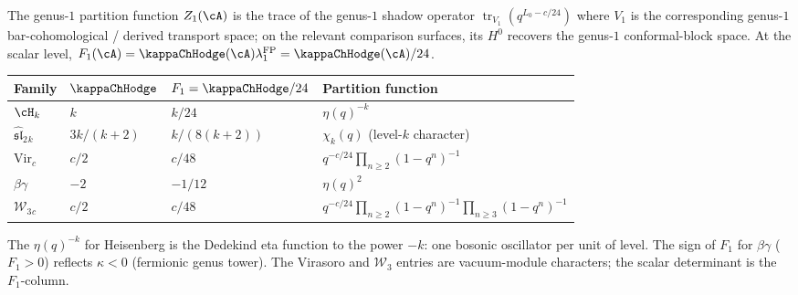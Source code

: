 \begin{computation}
\label{comp:genus1-partition-functions}
The genus-$1$ partition function $Z_1(\cA)$
is the trace of the genus-$1$ shadow operator
$\operatorname{tr}_{V_1}(q^{L_0-c/24})$ where
$V_1$ is the corresponding genus-$1$ bar-cohomological /
derived transport space; on the relevant comparison surfaces,
its $H^0$ recovers the genus-$1$ conformal-block space.
At the scalar level,
$F_1(\cA)=\kappaChHodge(\cA)\lambda_1^{\mathrm{FP}}
=\kappaChHodge(\cA)/24$.
\begin{center}
\renewcommand{\arraystretch}{1.2}
\begin{tabular}{llll}
\textbf{Family} & $\kappaChHodge$ & $F_1=\kappaChHodge/24$
 & \textbf{Partition function} \\
\hline
$\cH_k$ & $k$ & $k/24$
 & $\eta(q)^{-k}$ \\
$\widehat{\mathfrak{sl}}_2{}_k$
 & $3k/(k{+}2)$ & $k/(8(k{+}2))$
 & $\chi_k(q)$ (level-$k$ character) \\
$\mathrm{Vir}_c$ & $c/2$ & $c/48$
 & $q^{-c/24}\prod_{n\geq 2}(1-q^n)^{-1}$ \\
$\beta\gamma$ & $-2$ & $-1/12$
 & $\eta(q)^2$ \\
$\mathcal W_3{}_c$ & $c/2$ & $c/48$
 & $q^{-c/24}\prod_{n\geq2}(1-q^n)^{-1}
    \prod_{n\geq3}(1-q^n)^{-1}$
\end{tabular}
\end{center}
The $\eta(q)^{-k}$ for Heisenberg is the Dedekind eta
function to the power $-k$: one bosonic oscillator per unit
of level. The sign of $F_1$ for $\beta\gamma$ ($F_1>0$)
reflects $\kappa<0$ (fermionic genus tower).
The Virasoro and \(\mathcal W_3\) entries are vacuum-module
characters; the scalar determinant is the \(F_1\)-column.
\end{computation}

